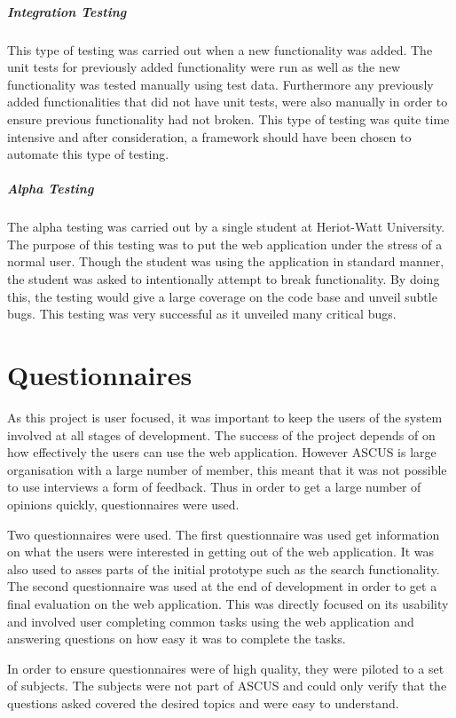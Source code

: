 \documentclass[a4paper,oneside,11pt]{report}
\begin{document}
\subparagraph{Integration Testing}
This type of testing was carried out when a new functionality was added. The unit tests for previously added functionality were run as well as the new functionality was tested manually using test data. Furthermore any previously added functionalities that did not have unit tests, were also manually in order to ensure previous functionality had not broken. This type of testing was quite time intensive and after consideration, a framework should have been chosen to automate this type of testing.

\subparagraph{Alpha Testing}
The alpha testing was carried out by a single student at Heriot-Watt University. The purpose of this testing was to put the web application under the stress of a normal user. Though the student was using the application in standard manner, the student was asked to intentionally attempt to break functionality. By doing this, the testing would give a large coverage on the code base and unveil subtle bugs. This testing was very successful as it unveiled many critical bugs.
\pagebreak
\section{Questionnaires}
As this project is user focused, it was important to keep the users of the system involved at all stages of development. The success of the project depends of on how effectively the users can use the web application. However ASCUS is large organisation with a large number of member, this meant that it was not possible to use interviews a form of feedback. Thus in order to get a large number of opinions quickly, questionnaires were used.

Two questionnaires were used. The first questionnaire was used get information on what the users were interested in getting out of the web application. It was also used to asses parts of the initial prototype such as the search functionality. The second questionnaire was used at the end of development in order to get a final evaluation on the web application. This was directly focused on its usability and involved user completing common tasks using the web application and answering questions on how easy it was to complete the tasks.

In order to ensure questionnaires were of high quality, they were piloted to a set of subjects. The subjects were not part of ASCUS and could only verify that the questions asked covered the desired topics and were easy to understand.
\end{document}
